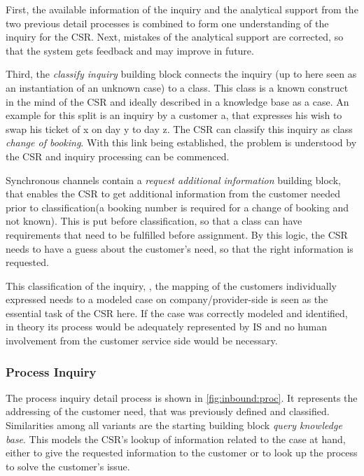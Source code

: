 	 First, the available information of the inquiry and the analytical support from the two previous detail processes is combined to form one understanding of the inquiry for the \acrshort{CSR}. Next, mistakes of the analytical support are corrected, so that the system gets feedback and may improve in future.
	 
	 Third, the \textit{ classify inquiry} building block connects the inquiry (up to here seen as an instantiation of an unknown case) to a class. This class is a known construct in the mind of the \acrfull{CSR} and ideally described in a knowledge base as a case. An example for this split is an inquiry by a customer a, that expresses his wish to swap his ticket of x on day y to day z. The \acrshort{CSR} can classify this inquiry as class \textit{change of booking}. With this link being established, the problem is understood by the  \acrshort{CSR} and inquiry processing can be commenced. 
	 
	 Synchronous channels contain a \textit{request additional information} building block, that enables the \acrshort{CSR} to get additional information from the customer needed prior to classification(a booking number is required for a change of booking and not known). This is put before classification, so that a class can have requirements that need to be fulfilled before assignment. By this logic, the \acrshort{CSR} needs to have a guess about the customer's need, so that the right information is requested.  
	 
	 This classification of the inquiry, \ie, the mapping of the customers individually expressed needs to a modeled case on company/provider-side is seen as the essential task of the \acrshort{CSR} here. If the case was correctly modeled and identified, in theory its process would be adequately represented by \acrshort{IS} and no human involvement from the customer service side would be necessary. 
	 
	 \subsubsection{Process Inquiry}
	 
	 The process inquiry detail process is shown in \Fig \ref{fig:inbound:proc}. It represents the addressing of the customer need, that was previously defined and classified. Similarities among all variants are the starting building block \textit{query knowledge base}. This models the \acrshort{CSR}'s lookup of information related to the case at hand, either to give the requested information to the customer or to look up the process to solve the customer's issue.  
	 
